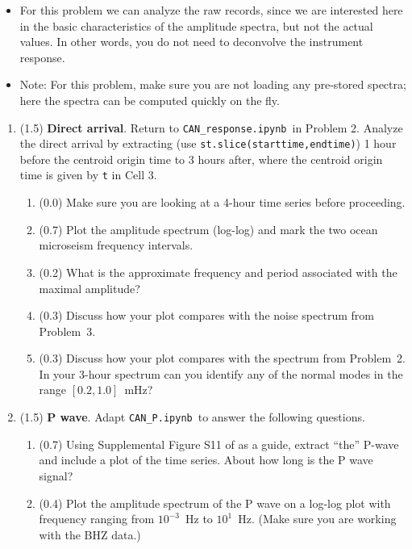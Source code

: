 \documentclass[11pt,titlepage,fleqn]{article}
\newcommand{\tfileresponse}{{\tt CAN\_response.ipynb}}
\newcommand{\tfileP}{{\tt CAN\_P.ipynb}}
\begin{document}
\begin{itemize}
\item For this problem we can analyze the raw records, since we are interested here in the basic characteristics of the amplitude spectra, but not the actual values. In other words, you do not need to deconvolve the instrument response.

\item Note: For this problem, make sure you are not loading any pre-stored spectra; here the spectra can be computed quickly on the fly.
\end{itemize}

\begin{enumerate}
\item (1.5) {\bf Direct arrival}. 
Return to \tfileresponse\ in Problem 2.
Analyze the direct arrival by extracting (use \verb+st.slice(starttime,endtime)+) 1 hour before the centroid origin time to 3 hours after, where the centroid origin time is given by \verb+t+ in Cell 3.

\begin{enumerate}
\item (0.0) Make sure you are looking at a 4-hour time series before proceeding.
\item (0.7) Plot the amplitude spectrum (log-log) and mark the two ocean microseism frequency intervals.
\item (0.2) What is the approximate frequency and period associated with the maximal amplitude?
\item (0.3) Discuss how your plot compares with the noise spectrum from Problem~3.
\item (0.3) Discuss how your plot compares with the spectrum from Problem~2. \\
In your 3-hour spectrum can you identify any of the normal modes in the range $[0.2,1.0]$~mHz?
\end{enumerate}


\item (1.5) {\bf P wave}. Adapt \tfileP\ to answer the following questions.
%
\begin{enumerate}
\item (0.7) Using Supplemental Figure S11 of \citet{Ammon2005} as a guide, extract ``the'' P-wave and include a plot of the time series. About how long is the P wave signal?
\item (0.4) Plot the amplitude spectrum of the P wave on a log-log plot with frequency ranging from $10^{-3}$~Hz to $10^1$~Hz. (Make sure you are working with the BHZ data.)


\end{enumerate}
\end{enumerate}
\end{document}
